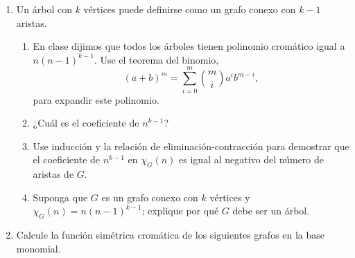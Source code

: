 \documentclass{article}
\begin{document}
\begin{enumerate}
\item Un árbol con $k$ vértices puede definirse como un grafo conexo con $k-1$ aristas.
\begin{enumerate}
\item En clase dijimos que todos los árboles tienen polinomio cromático igual a $n(n-1)^{k-1}$. Use el teorema del binomio,
\[
(a+b)^m = \sum_{i=0}^m \binom{m}{i} a^ib^{m-i},
\]
para expandir este polinomio.
\item ¿Cuál es el coeficiente de $n^{k-1}$?
\item Use inducción y la relación de eliminación-contracción para demostrar que el coeficiente de $n^{k-1}$ en $\chi_G(n)$ es igual al negativo del número de aristas de $G$.
\item Suponga que $G$ es un grafo conexo con $k$ vértices y $\chi_G(n) = n(n-1)^{k-1}$; explique por qué $G$ debe ser un árbol.
\end{enumerate}

\item Calcule la función simétrica cromática de los siguientes grafos en la base monomial.

\begin{center}
\hskip 1in
\end{center}


\end{enumerate}
\end{document}
